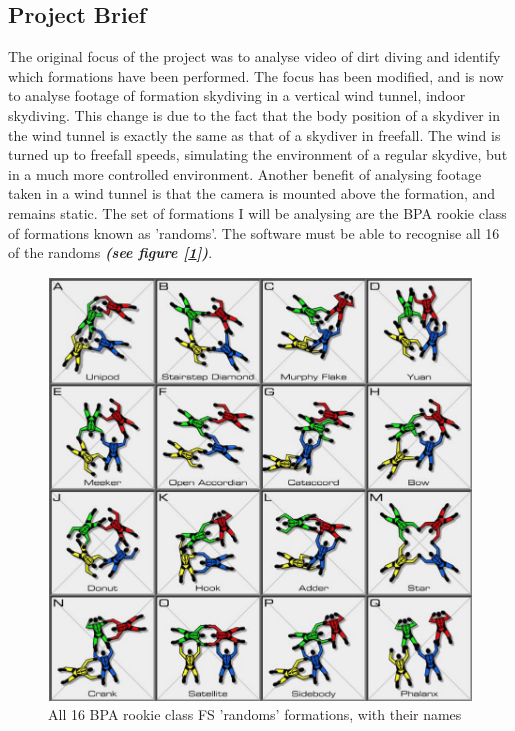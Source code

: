 \documentclass[a4paper, 11pt]{article}
\begin{document}
	\subsection{Project Brief}
The original focus of the project was to analyse video of dirt diving and identify which formations have been performed. The focus has been modified, and is now to analyse footage of formation skydiving in a vertical wind tunnel, indoor skydiving. This change is due to the fact that the body position of a skydiver in the wind tunnel is exactly the same as that of a skydiver in freefall. The wind is turned up to freefall speeds, simulating the environment of a regular skydive, but in a much more controlled environment. Another benefit of analysing footage taken in a wind tunnel is that the camera is mounted above the formation, and remains static. The set of formations I will be analysing are the BPA rookie class of formations known as 'randoms'. The software must be able to recognise all 16 of the randoms \textbf{\emph{(see figure [\ref{fig:fs_dive_pool}])}}.
%
\begin{figure}[H]
	\centering
	\includegraphics[width=\linewidth]{FS_All.png}
	\caption{All 16 BPA rookie class FS 'randoms' formations, with their names}
	\label{fig:fs_dive_pool}
\end{figure}
%
\end{document}

